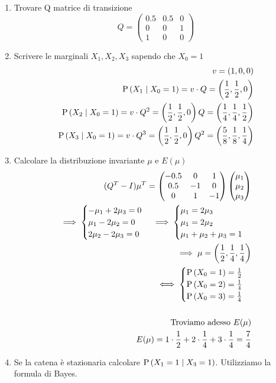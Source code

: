 \begin{enumerate}
	\item Trovare Q matrice di transizione 
	\[ Q = \begin{pmatrix}
	0.5 & 0.5 & 0 \\
	0 & 0 & 1 \\ 
	1 & 0 & 0
	\end{pmatrix} \]
	\item Scrivere le marginali $ X_1, X_2, X_3 $ sapendo che $ X_0 = 1 $
	\[ \begin{aligned}
	v = (1, 0, 0) \\ 
	\text{P}\left(X_1 \mid X_0 = 1\right) = v \cdot Q = \left(\dfrac{1}{2}, \dfrac{1}{2}, 0\right) \\
	\text{P}\left(X_2 \mid X_0 = 1\right) = v \cdot Q^2 = \left(\dfrac{1}{2}, \dfrac{1}{2}, 0\right) Q = \left( \dfrac{1}{4}, \dfrac{1}{4}, \dfrac{1}{2} \right) \\
	\text{P}\left(X_3 \mid X_0 = 1\right) = v \cdot Q^3 = \left(\dfrac{1}{2}, \dfrac{1}{2}, 0\right) Q^2 = \left(\dfrac{5}{8}, \dfrac{1}{8}, \dfrac{1}{4}\right)\\
	\end{aligned} \]
	\item Calcolare la distribuzione invariante $ \mu $ e $ E(\mu) $ 
	\[ \begin{aligned}
	(Q^T-I)\mu^T = \begin{pmatrix}
	-0.5 & 0 & 1 \\
	0.5 & -1 & 0 \\
	0 & 1 & -1
	\end{pmatrix} \begin{pmatrix}
	\mu_1 \\ \mu_2 \\ \mu_3
	\end{pmatrix} \\
	\implies \begin{cases}
	- \mu_1 + 2\mu_3 = 0 \\ 
	\mu_1 - 2\mu_2 = 0 \\
	2\mu_2 - 2\mu_3 = 0
	\end{cases} \implies \begin{cases}
	\mu_1 = 2\mu_3 \\
	\mu_1 = 2\mu_2 \\
	\mu_1 + \mu_2 + \mu_3 = 1
	\end{cases} \\ 
	\implies \mu = \left(\dfrac{1}{2}, \dfrac{1}{4}, \dfrac{1}{4}\right) \\ 
	\iff \begin{cases}
	\text{P}\left(X_0 = 1\right) = \frac{1}{2} \\
	\text{P}\left(X_0 = 2\right) = \frac{1}{4} \\
	\text{P}\left(X_0 = 3\right) = \frac{1}{4} \\	
	\end{cases} 
	\\ \\ \text{Troviamo adesso } E(\mu) \\
	E(\mu) = 1 \cdot \dfrac{1}{2} + 2 \cdot \dfrac{1}{4} + 3 \cdot \dfrac{1}{4} = \dfrac{7}{4}
	\end{aligned} \]
	\item Se la catena è stazionaria calcolare $ \text{P}\left(X_1 = 1 \mid X_3 = 1\right) $. Utilizziamo la formula di Bayes. 
	

\end{enumerate}
